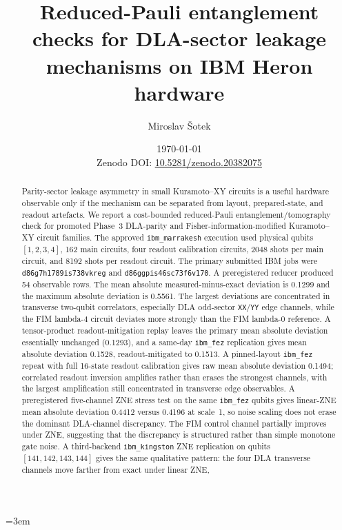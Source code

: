 \documentclass[preprint,aps,physrev,superscriptaddress,floatfix,longbibliography]{revtex4-2}
\newcommand{\paperdoi}{Zenodo DOI: \href{https://doi.org/10.5281/zenodo.20382075}{10.5281/zenodo.20382075}}
\begin{document}
\emergencystretch=3em

\title{Reduced-Pauli entanglement checks for DLA-sector leakage mechanisms on IBM Heron hardware}

\author{Miroslav \v{S}otek}

\date{\today\\\paperdoi}

\begin{abstract}
Parity-sector leakage asymmetry in small Kuramoto--XY circuits is a useful
hardware observable only if the mechanism can be separated from layout,
prepared-state, and readout artefacts. We report a cost-bounded reduced-Pauli
entanglement/tomography check for promoted Phase~3 DLA-parity and
Fisher-information-modified Kuramoto--XY circuit families. The approved
\texttt{ibm\_marrakesh} execution used physical qubits $[1,2,3,4]$, 162 main
circuits, four readout calibration circuits, 2048 shots per main circuit, and
8192 shots per readout circuit. The primary submitted IBM jobs were
\texttt{d86g7h1789is738vkreg} and \texttt{d86ggpis46sc73f6v170}. A
preregistered reducer produced 54 observable rows. The mean absolute
measured-minus-exact deviation is 0.1299 and the maximum absolute deviation is
0.5561. The largest deviations are concentrated in transverse two-qubit
correlators, especially DLA odd-sector \texttt{XX}/\texttt{YY} edge channels,
while the FIM lambda-4 circuit deviates more strongly than
the FIM lambda-0 reference. A tensor-product readout-mitigation
replay leaves the primary mean absolute deviation essentially unchanged
(0.1293), and a same-day \texttt{ibm\_fez} replication gives mean absolute
deviation 0.1528, readout-mitigated to 0.1513. A pinned-layout
\texttt{ibm\_fez} repeat with full 16-state readout calibration gives raw mean
absolute deviation 0.1494; correlated readout inversion amplifies rather than
erases the strongest channels, with the largest amplification still
concentrated in transverse edge observables. A preregistered five-channel ZNE
stress test on the same \texttt{ibm\_fez} qubits gives linear-ZNE mean
absolute deviation 0.4412 versus 0.4196 at scale~1, so noise scaling does not
erase the dominant DLA-channel discrepancy. The FIM control channel partially
improves under ZNE, suggesting that the discrepancy is structured rather than
simple monotone gate noise. A third-backend \texttt{ibm\_kingston} ZNE
replication on qubits $[141,142,143,144]$ gives the same qualitative pattern:
the four DLA transverse channels move farther from exact under linear ZNE,

\end{abstract}
\end{document}
